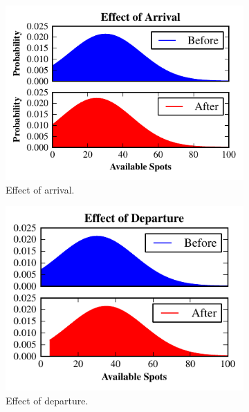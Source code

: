 \begin{figure}
  \begin{subfigure}[b]{0.33\textwidth}
    \centering
    \includegraphics[width=\textwidth]{./figures/arrival.pdf}
    \caption{Effect of arrival.}
    \label{fig-examples-arrival}
  \end{subfigure}
  \begin{subfigure}[b]{0.33\textwidth}
    \centering
    \includegraphics[width=\textwidth]{./figures/departure.pdf}
    \caption{Effect of departure.}
    \label{fig-examples-departure}
  \end{subfigure}
  \begin{subfigure}[b]{0.33\textwidth}
    \centering

\end{subfigure}
\end{figure}
